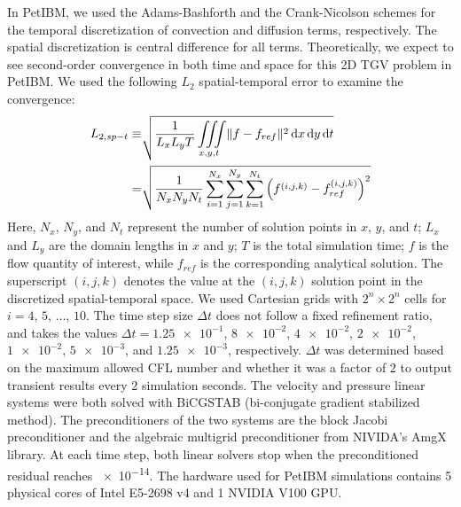 In PetIBM, we used the Adams-Bashforth and the Crank-Nicolson schemes for the temporal discretization of convection and diffusion terms, respectively.
The spatial discretization is central difference for all terms.
Theoretically, we expect to see second-order convergence in both time and space for this 2D TGV problem in PetIBM.
We used the following $L_2$ spatial-temporal error to examine the convergence:
\begin{equation}\label{eq:spt-err-def}
    \begin{aligned}
    L_{2,sp-t} \equiv &\sqrt{
        \frac{1}{L_x L_y T}
        \iiint\limits_{x, y, t} \lVert f - f_{ref} \rVert^2 \mathop{}\!\mathrm{d} x \mathop{}\!\mathrm{d} y \mathop{}\!\mathrm{d} t
    } \\
    = &
    \sqrt{\frac{1}{N_x N_y N_t}\sum\limits_{i=1}^{N_x}\sum\limits_{j=1}^{N_y}\sum\limits_{k=1}^{N_t}\left(f^{(i, j, k)} - f_{ref}^{(i, j, k)}\right)^2}
    \end{aligned}
\end{equation}
Here, $N_x$, $N_y$, and $N_t$ represent the number of solution points in $x$, $y$, and $t$;
$L_x$ and $L_y$ are the domain lengths in $x$ and $y$;
$T$ is the total simulation time;
$f$ is the flow quantity of interest, while $f_{ref}$ is the corresponding analytical solution.
The superscript $(i, j, k)$ denotes the value at the $(i, j, k)$ solution point in the discretized spatial-temporal space.
We used Cartesian grids with $2^{n} \times 2^{n}$ cells for $i=4$, $5$, $\dots$, $10$.
The time step size $\Delta t$ does not follow a fixed refinement ratio, and takes the values $\Delta t = \num{1.25e-1}$, $\num{8e-2}$, $\num{4e-2}$, $\num{2e-2}$, $\num{1e-2}$, $\num{5e-3}$, and $\num{1.25e-3}$, respectively.
$\Delta t$ was determined based on the maximum allowed CFL number and whether it was a factor of $2$ to output transient results every $\num{2}$ simulation seconds.
The velocity and pressure linear systems were both solved with BiCGSTAB (bi-conjugate gradient stabilized method).
The preconditioners of the two systems are the block Jacobi preconditioner and the algebraic multigrid preconditioner from NIVIDA's AmgX library.
At each time step, both linear solvers stop when the preconditioned residual reaches \num{e-14}.
The hardware used for PetIBM simulations contains 5 physical cores of Intel E5-2698 v4 and 1 NVIDIA V100 GPU.

